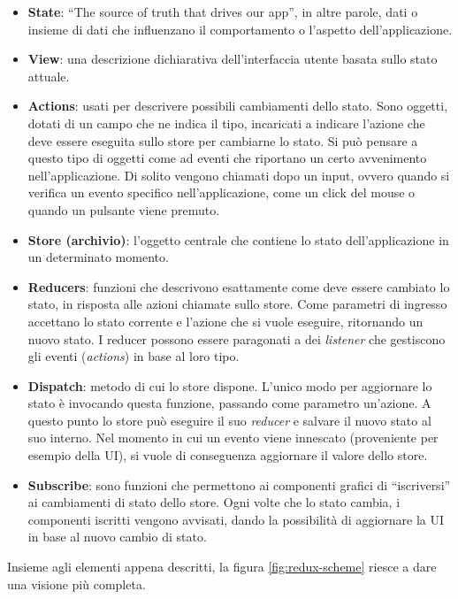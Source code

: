 \begin{itemize}	
	\item \textbf{State}: ``The source of truth that drives our app'', in altre parole, dati o insieme di dati che influenzano il comportamento o l'aspetto dell'applicazione. 	
	\item \textbf{View}: una descrizione dichiarativa dell'interfaccia utente basata sullo stato attuale.
	\item \textbf{Actions}: usati per descrivere possibili cambiamenti dello stato. Sono oggetti, dotati di un campo che ne indica il tipo, incaricati a indicare l'azione che deve essere eseguita sullo store per cambiarne lo stato. Si può pensare a questo tipo di oggetti come ad eventi che riportano un certo avvenimento nell'applicazione. Di solito vengono chiamati dopo un input, ovvero quando si verifica un evento specifico nell'applicazione, come un click del mouse o quando un pulsante viene premuto.
	\item \textbf{Store (archivio)}: l'oggetto centrale che contiene lo stato dell'applicazione in un determinato momento.
	\item \textbf{Reducers}: funzioni che descrivono esattamente come deve essere cambiato lo stato, in risposta alle azioni chiamate sullo store. Come parametri di ingresso accettano lo stato corrente e l'azione che si vuole eseguire, ritornando un nuovo stato. I reducer possono essere paragonati a dei \textit{listener} che gestiscono gli eventi (\textit{actions}) in base al loro tipo.
	\item \textbf{Dispatch}: metodo di cui lo store dispone. L'unico modo per aggiornare lo stato è invocando questa funzione, passando come parametro un'azione.  A questo punto lo store può eseguire il suo \textit{reducer} e salvare il nuovo stato al suo interno. Nel momento in cui un evento viene innescato (proveniente per esempio della UI), si vuole di conseguenza aggiornare il valore dello store.
	\item \textbf{Subscribe}: sono funzioni che permettono ai componenti grafici di ``iscriversi'' ai cambiamenti di stato dello store. Ogni volte che lo stato cambia, i componenti iscritti vengono avvisati, dando la possibilità di aggiornare la UI in base al nuovo cambio di stato.
\end{itemize}
Insieme agli elementi appena descritti, la figura \cref{fig:redux-scheme} riesce a dare una visione più completa.
